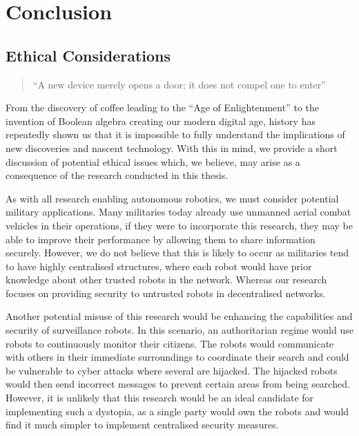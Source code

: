 \chapter{Conclusion}

\section{Ethical Considerations}

\begin{quote}
    \centering 
    ``A new device merely opens a door; it does not compel one to enter''\\
\end{quote}

From the discovery of coffee leading to the ``Age of Enlightenment'' to the invention of Boolean algebra creating our modern digital age, history has repeatedly shown us that it is impossible to fully understand the implications of new discoveries and nascent technology. With this in mind, we provide a short discussion of potential ethical issues which, we believe, may arise as a consequence of the research conducted in this thesis.

As with all research enabling autonomous robotics, we must consider potential military applications. Many militaries today already use unmanned aerial combat vehicles in their operations, if they were to incorporate this research, they may be able to improve their performance by allowing them to share information securely. However, we do not believe that this is likely to occur as militaries tend to have highly centralised structures, where each robot would have prior knowledge about other trusted robots in the network. Whereas our research focuses on providing security to untrusted robots in decentralised networks.

Another potential misuse of this research would be enhancing the capabilities and security of surveillance robots. In this scenario, an authoritarian regime would use robots to continuously monitor their citizens. The robots would communicate with others in their immediate surroundings to coordinate their search and could be vulnerable to cyber attacks where several are hijacked. The hijacked robots would then send incorrect messages to prevent certain areas from being searched. However, it is unlikely that this research would be an ideal candidate for implementing such a dystopia, as a single party would own the robots and would find it much simpler to implement centralised security measures.

